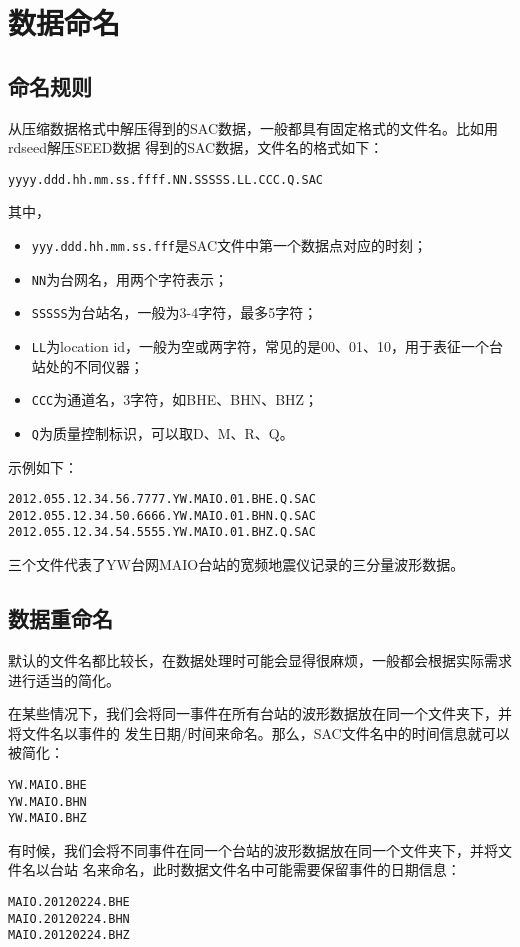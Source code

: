 \section{数据命名}
\subsection{命名规则}
从压缩数据格式中解压得到的SAC数据，一般都具有固定格式的文件名。比如用rdseed解压SEED数据
得到的SAC数据，文件名的格式如下：
\begin{verbatim}
yyyy.ddd.hh.mm.ss.ffff.NN.SSSSS.LL.CCC.Q.SAC
\end{verbatim}
其中，
\begin{itemize}
\item \verb+yyy.ddd.hh.mm.ss.fff+是SAC文件中第一个数据点对应的时刻；
\item \verb+NN+为台网名，用两个字符表示；
\item \verb+SSSSS+为台站名，一般为3-4字符，最多5字符；
\item \verb+LL+为location id，一般为空或两字符，常见的是00、01、10，用于表征一个台站处的不同仪器；
\item \verb+CCC+为通道名，3字符，如BHE、BHN、BHZ；
\item \verb+Q+为质量控制标识，可以取D、M、R、Q。
\end{itemize}

示例如下：
\begin{verbatim}
2012.055.12.34.56.7777.YW.MAIO.01.BHE.Q.SAC
2012.055.12.34.50.6666.YW.MAIO.01.BHN.Q.SAC
2012.055.12.34.54.5555.YW.MAIO.01.BHZ.Q.SAC
\end{verbatim}
三个文件代表了YW台网MAIO台站的宽频地震仪记录的三分量波形数据。

\subsection{数据重命名}
默认的文件名都比较长，在数据处理时可能会显得很麻烦，一般都会根据实际需求进行适当的简化。

在某些情况下，我们会将同一事件在所有台站的波形数据放在同一个文件夹下，并将文件名以事件的
发生日期/时间来命名。那么，SAC文件名中的时间信息就可以被简化：
\begin{verbatim}
YW.MAIO.BHE
YW.MAIO.BHN
YW.MAIO.BHZ
\end{verbatim}

有时候，我们会将不同事件在同一个台站的波形数据放在同一个文件夹下，并将文件名以台站
名来命名，此时数据文件名中可能需要保留事件的日期信息：
\begin{verbatim}
MAIO.20120224.BHE
MAIO.20120224.BHN
MAIO.20120224.BHZ
\end{verbatim}

